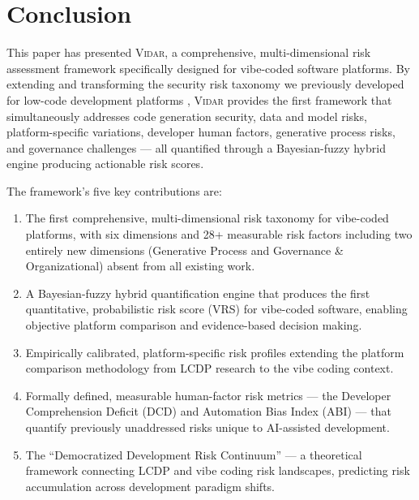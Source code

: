 \documentclass[preprint,review,12pt]{elsarticle}
\newcommand{\vidar}{\textsc{Vidar}}
\begin{document}
\section{Conclusion}
\label{sec:conclusion}

This paper has presented \vidar{}, a comprehensive, multi-dimensional risk assessment framework specifically designed for vibe-coded software platforms. By extending and transforming the security risk taxonomy we previously developed for low-code development platforms \cite{hathnagoda2024assessing}, \vidar{} provides the first framework that simultaneously addresses code generation security, data and model risks, platform-specific variations, developer human factors, generative process risks, and governance challenges --- all quantified through a Bayesian-fuzzy hybrid engine producing actionable risk scores.

The framework's five key contributions are:

\begin{enumerate}
    \item The first comprehensive, multi-dimensional risk taxonomy for vibe-coded platforms, with six dimensions and 28+ measurable risk factors including two entirely new dimensions (Generative Process and Governance \& Organizational) absent from all existing work.

    \item A Bayesian-fuzzy hybrid quantification engine that produces the first quantitative, probabilistic risk score (VRS) for vibe-coded software, enabling objective platform comparison and evidence-based decision making.

    \item Empirically calibrated, platform-specific risk profiles extending the platform comparison methodology from LCDP research to the vibe coding context.

    \item Formally defined, measurable human-factor risk metrics --- the Developer Comprehension Deficit (DCD) and Automation Bias Index (ABI) --- that quantify previously unaddressed risks unique to AI-assisted development.

    \item The ``Democratized Development Risk Continuum'' --- a theoretical framework connecting LCDP and vibe coding risk landscapes, predicting risk accumulation across development paradigm shifts.
\end{enumerate}
\end{document}
